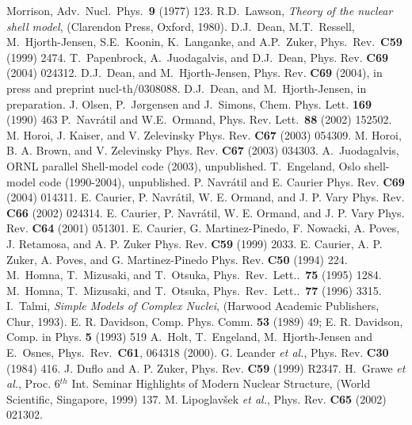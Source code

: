 \documentclass[twoside,12pt]{article}
\begin{document}
\begin{thebibliography}{200}
                  Morrison, Adv.\ Nucl.\ Phys.\ {\bf 9} (1977) 123.
 R.D.~Lawson, {\em Theory of the nuclear shell model},
(Clarendon Press, Oxford, 1980).
 D.J.\ Dean, M.T.\ Ressell, M.\ Hjorth-Jensen, S.E.\ Koonin, 
K.\ Langanke, and A.P.\ Zuker, Phys.\ Rev.\ {\bf C59} (1999) 2474.
 T.~Papenbrock, A.~Juodagalvis, and D.J.~Dean, 
Phys. Rev. {\bf C69} (2004) 024312.
 D.J.~Dean, and M.~Hjorth-Jensen, 
Phys. Rev. {\bf C69} (2004), in press and preprint nucl-th/0308088.
 D.J.~Dean, and M.~Hjorth-Jensen, in preparation.
 J. Olsen, P.~J{\o}rgensen and J.~Simons, Chem. Phys. Lett.
{\bf 169} (1990) 463
 P.~Navr\'atil and W.E.~Ormand, Phys. Rev. Lett.~{\bf 88} (2002) 152502.
   M. Horoi, J. Kaiser, and V. Zelevinsky
Phys. Rev. {\bf C67} (2003) 054309.
 M. Horoi, B. A. Brown, and V. Zelevinsky
Phys. Rev. {\bf C67} (2003) 034303.
 A.~Juodagalvis, ORNL parallel Shell-model code (2003), unpublished.
 T.~Engeland, Oslo shell-model code (1990-2004), unpublished.
P. Navr\'atil and E. Caurier
Phys. Rev. {\bf C69} (2004) 014311.
E. Caurier, P. Navr\'atil, W. E. Ormand, and J. P. Vary
Phys. Rev. {\bf C66} (2002) 024314.
E. Caurier, P. Navr\'atil, W. E. Ormand, and J. P. Vary
Phys. Rev. {\bf C64} (2001) 051301. 
E. Caurier, G. Martinez-Pinedo, F. Nowacki, A. Poves, J. Retamosa, and A. P. Zuker
Phys. Rev. {\bf C59} (1999) 2033. 
E. Caurier, A. P. Zuker, A. Poves, and G. Martinez-Pinedo
Phys. Rev. {\bf C50} (1994) 224. 
 M.~Homna, T.~Mizusaki, and T.~Otsuka,
Phys.~Rev.~Lett..~{\bf 75}  (1995) 1284.
 M.~Homna, T.~Mizusaki, and T.~Otsuka,
Phys.~Rev.~Lett..~{\bf 77}  (1996) 3315.
 I.~Talmi, {\em Simple Models of Complex Nuclei},
(Harwood Academic Publishers, Chur, 1993).
 E. R. Davidson, Comp. Phys. Comm. {\bf 53} (1989) 49;
                E. R. Davidson, Comp. in  Phys. {\bf 5} (1993) 519
 A.~Holt, T.~Engeland, M.~Hjorth-Jensen and E.~Osnes,
Phys.~Rev.~{\bf C61}, 064318 (2000).
 G. Leander {\it et al.}, Phys. Rev. {\bf C30} (1984) 416.
 J. Duflo and A. P. Zuker, Phys. Rev. {\bf C59}  (1999) R2347.
H.~Grawe {\em et al.}, Proc. 6$^{th}$ Int. Seminar Highlights of
Modern Nuclear Structure, (World Scientific, Singapore, 1999) 137.
M. Lipoglav\v{s}ek {\it et al.}, Phys. Rev. {\bf C65} (2002) 021302.

\end{thebibliography}
\end{document}
